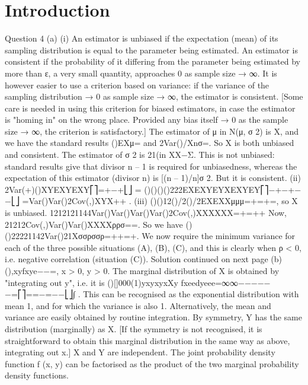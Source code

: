 \documentclass{article}
\author{kobriendublin }
\date{December 2018}
\begin{document}
\section{Introduction}
\begin{enumerate}[(i)] Question 4
(a) (i) An estimator is unbiased if the expectation (mean) of its sampling distribution is equal to the parameter being estimated. An estimator is consistent if the probability of it differing from the parameter being estimated by more than ε, a very small quantity, approaches 0 as sample size → ∞. It is however easier to use a criterion based on variance: if the variance of the sampling distribution → 0 as sample size → ∞, the estimator is consistent. [Some care is needed in using this criterion for biased estimators, in case the estimator is "homing in" on the wrong place. Provided any bias itself → 0 as the sample size → ∞, the criterion is satisfactory.]
The estimator of μ in N(μ, σ 2) is X, and we have the standard results ()EXμ= and 2Var()/Xnσ=. So X is both unbiased and consistent.
The estimator of σ 2 is 21(in XX−Σ. This is not unbiased: standard results give that divisor n – 1 is required for unbiasedness, whereas the expectation of this estimator (divisor n) is [(n – 1)/n]σ 2. But it is consistent.
   (ii) {}2Var(+)()XYEXYEXY⎡⎤=+−+⎣⎦
   = (){}(){}(){}(){}222EXEXYEYXEXYEY⎡⎤−+−+−−⎣⎦
   =Var()Var()2Cov(,)XYX++ .
   (iii) ()()12()/2()/2EXEXXμμμ=+=+=, so X is unbiased.
   {}1212121144Var()Var()Var()Var()2Cov(,)XXXXXX=+=++
     Now, 21212Cov(,)Var()Var()XXXXρρσ==. So we have
   ()()22221142Var()21Xσσρσσρ=++=+.
   We now require the minimum variance for each of the three possible situations (A), (B), (C), and this is clearly when ρ < 0, i.e. negative correlation (situation (C)).
   Solution continued on next page
   (b) (),xyfxye−−=, x > 0, y > 0.
   The marginal distribution of X is obtained by "integrating out y", i.e. it is
   ()[]000(1)yxyxyxXy fxeedyeee=∞∞−−−−−−=⎡⎤==−=−−⎣⎦∫ .
   This can be recognised as the exponential distribution with mean 1, and for which the variance is also 1. Alternatively, the mean and variance are easily obtained by routine integration.
   By symmetry, Y has the same distribution (marginally) as X. [If the symmetry is not recognised, it is straightforward to obtain this marginal distribution in the same way as above, integrating out x.]
   X and Y are independent. The joint probability density function f (x, y) can be factorised as the product of the two marginal probability density functions.
   
   
 \end{enumerate}
\end{document}
